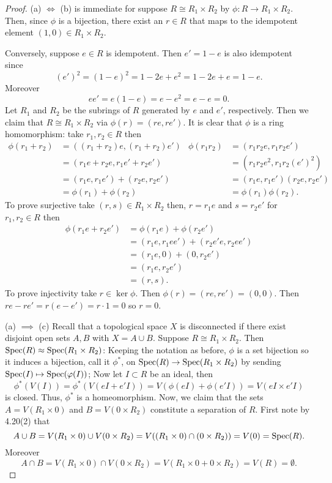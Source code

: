 \begin{proof}
(a) $\iff$ (b) is immediate for suppose $R\cong R_1\times
R_2$ by $\phi\colon R\to R_1\times R_2$. Then, since $\phi$ is a
bijection, there exist an $r\in R$ that maps to the idempotent
element $(1,0)\in R_1\times R_2$.

Conversely, suppose $e\in R$ is idempotent. Then $e'=1-e$ is also
idempotent since
\[
(e')^2=(1-e)^2=1-2e+e^2=1-2e+e=1-e.
\]
Moreover
\[
ee'=e(1-e)=e-e^2=e-e=0.
\]
Let $R_1$ and $R_2$ be the subrings of $R$ generated by $e$ and
$e'$, respectively. Then we claim that $R\cong R_1\times R_2$ via
$\phi(r)=(re,re')$. It is clear that $\phi$ is a ring
homomorphism: take $r_1,r_2\in R$ then
\begin{align*}
\phi(r_1+r_2)&=((r_1+r_2)e,(r_1+r_2)e')&
\phi(r_1r_2)&=(r_1r_2e,r_1r_2e')\\
&=(r_1e+r_2e,r_1e'+r_2e')&
&=\left(r_1r_2e^2,r_1r_2(e')^2\right)\\
&=(r_1e,r_1e')+(r_2e,r_2e')&
&=(r_1e,r_1e')(r_2e,r_2e')\\
&=\phi(r_1)+\phi(r_2)&
&=\phi(r_1)\phi(r_2).
\end{align*}
To prove surjective take $(r,s)\in R_1\times
R_2$ then, $r=r_1e$ and $s=r_2e'$ for $r_1,r_2\in R$ then
\begin{align*}
\phi(r_1e+r_2e')&=\phi(r_1e)+\phi(r_2e')\\
&=(r_1e,r_1ee')+(r_2e'e,r_2ee')\\
&=(r_1e,0)+(0,r_2e')\\
&=(r_1e,r_2e')\\
&=(r,s).
\end{align*}
To prove injectivity take $r\in\ker\phi$. Then
$\phi(r)=(re,re')=(0,0)$. Then $re-re'=r(e-e')=r\cdot 1=0$ so
$r=0$.

(a) $\implies$ (c) Recall that a topological space $X$ is
disconnected if there exist disjoint open sets $A,B$ with
$X=A\cup B$. Suppose $R\cong R_1\times R_2$. Then
$\operatorname{Spec}(R)\approx \operatorname{Spec}(R_1\times R_2)$: Keeping the notation as
before, $\phi$ is a set bijection so it induces a bijection, call
it $\phi^*$, on $\operatorname{Spec}(R)\to\operatorname{Spec}(R_1\times R_2)$ by sending
$\operatorname{Spec}(I)\mapsto\operatorname{Spec}(\varphi(I))$; Now let $I\subset R$ be an
ideal, then
\[
\phi^*(V(I))=\phi^*\left(V(eI+e'I)\right)=V(\phi(eI)+\phi(e'I))=V(eI\times e'I)
\]
is closed. Thus, $\phi^*$ is a homeomorphism. Now, we claim that
the sets $A=V(R_1\times 0)$ and $B=V(0\times R_2)$ constitute a
separation of $R$. First note by 4.20(2) that
\[
A\cup B=V(R_1\times 0)\cup V(0\times R_2)=V((R_1\times
0)\cap(0\times R_2))=V(0)=\operatorname{Spec}(R).
\]
Moreover
\[
A\cap B=V(R_1\times 0)\cap V(0\times R_2)=V(R_1\times 0+0\times R_2)=V(R)=\emptyset.
\]

\end{proof}
